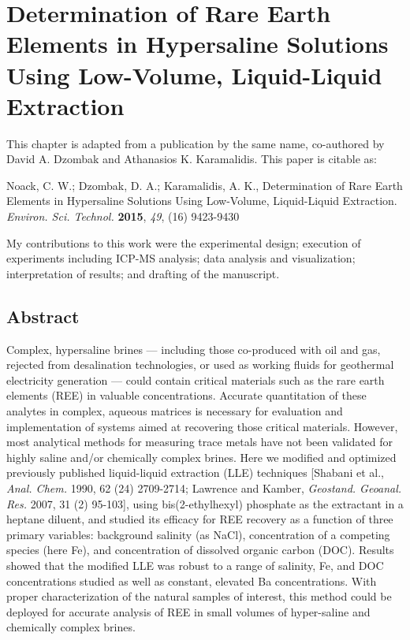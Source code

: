 \chapter{Determination of Rare Earth Elements in Hypersaline Solutions Using Low-Volume, Liquid-Liquid Extraction}\label{chap:LLE}

This chapter is adapted from a publication by the same name, co-authored by David A. Dzombak and Athanasios K. Karamalidis.
This paper is citable as: 

Noack, C. W.; Dzombak, D. A.; Karamalidis, A. K., Determination of Rare Earth Elements in Hypersaline Solutions Using Low-Volume, Liquid-Liquid Extraction. \textit{Environ. Sci. Technol.} \textbf{2015}, \textit{49}, (16) 9423-9430

My contributions to this work were the experimental design; execution of experiments including ICP-MS analysis; data analysis and visualization; interpretation of results; and drafting of the manuscript.

\clearpage

\section*{Abstract}
Complex, hypersaline brines --- including those co-produced with oil and gas, rejected from desalination technologies, or used as working fluids for geothermal electricity generation --- could contain critical materials such as the rare earth elements (REE) in valuable concentrations.
Accurate quantitation of these analytes in complex, aqueous matrices is necessary for evaluation and implementation of systems aimed at recovering those critical materials.
However, most analytical methods for measuring trace metals have not been validated for highly saline and/or chemically complex brines.
Here we modified and optimized previously published liquid-liquid extraction (LLE) techniques [Shabani et al., \textit{Anal. Chem.} 1990, 62 (24) 2709-2714; Lawrence and Kamber, \textit{Geostand. Geoanal. Res.} 2007, 31 (2) 95-103], using bis(2-ethylhexyl) phosphate as the extractant in a heptane diluent, and studied its efficacy for REE recovery as a function of three primary variables: background salinity (as NaCl), concentration of a competing species (here Fe), and concentration of dissolved organic carbon (DOC).
Results showed that the modified LLE was robust to a range of salinity, Fe, and DOC concentrations studied as well as constant, elevated Ba concentrations.
With proper characterization of the natural samples of interest, this method could be deployed for accurate analysis of REE in small volumes of hyper-saline and chemically complex brines.

